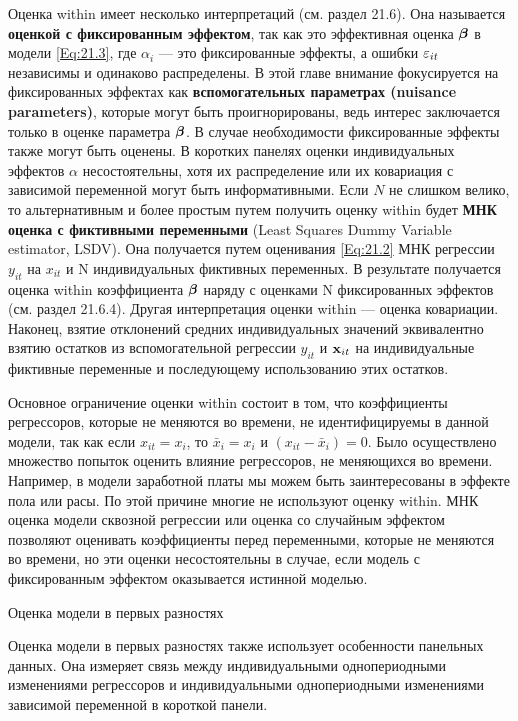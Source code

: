 Оценка within имеет несколько интерпретаций (см. раздел 21.6). Она называется \textbf{оценкой с фиксированным эффектом}, так как это эффективная оценка $\bm{\beta}$ в модели \ref{Eq:21.3}, где $\alpha_i$ --- это фиксированные эффекты, а ошибки $\varepsilon_{it}$ независимы и одинаково распределены. В этой главе внимание фокусируется на фиксированных эффектах как \textbf{вспомогательных параметрах (nuisance parameters)}, которые могут быть проигнорированы, ведь интерес заключается только в оценке параметра $\bm{\beta}$. В случае необходимости фиксированные эффекты также могут быть оценены. В коротких панелях  оценки индивидуальных эффектов $\alpha$ несостоятельны, хотя их распределение или их ковариация с зависимой переменной могут быть информативными. Если $N$ не слишком велико, то альтернативным и более простым путем получить оценку within будет \textbf{МНК оценка с фиктивными переменными} (Least Squares Dummy Variable estimator, LSDV). Она получается путем оценивания \ref{Eq:21.2} МНК регрессии $y_{it}$ на $x_{it}$ и  N индивидуальных фиктивных переменных. В результате получается  оценка within коэффициента $\bm{\beta}$ наряду с оценками N фиксированных эффектов (см. раздел 21.6.4). Другая интерпретация оценки within --- оценка ковариации. Наконец, взятие отклонений средних индивидуальных значений эквивалентно взятию остатков из вспомогательной регрессии $y_{it}$ и $\mathbf{x}_{it}$ на индивидуальные фиктивные переменные и последующему использованию этих остатков.

Основное ограничение оценки within состоит в том, что коэффициенты регрессоров, которые не меняются во времени, не идентифицируемы в данной модели, так как если $x_{it}=x_i$, то $\bar{x}_i=x_i$ и $(x_{it}-\bar{x}_i)=0$. Было осуществлено множество попыток оценить влияние регрессоров, не меняющихся во времени. Например, в модели заработной платы мы можем быть заинтересованы в эффекте пола или расы. По этой причине многие не используют оценку within. МНК оценка модели сквозной регрессии или оценка со случайным эффектом позволяют оценивать коэффициенты перед переменными, которые не меняются во времени, но эти оценки несостоятельны в случае, если модель с фиксированным эффектом оказывается истинной моделью.


{\centering
Оценка модели в первых разностях\\}

Оценка модели в первых разностях также использует особенности панельных данных. Она измеряет связь между индивидуальными однопериодными изменениями регрессоров и индивидуальными однопериодными изменениями зависимой переменной в короткой панели.

